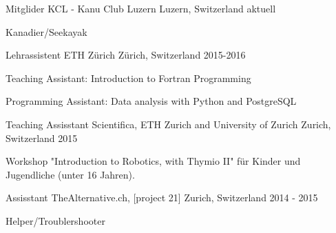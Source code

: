 

\begin{cventries}

\cventry
{Mitglider} %
{KCL - Kanu Club Luzern} %
{Luzern, Switzerland} %
{aktuell} %
{
	\begin{cvitems} %
		\item {Kanadier/Seekayak}
	\end{cvitems}
}
	
\cventry
	{Lehrassistent} %
	{ETH Zürich} %
	{Zürich, Switzerland} %
	{2015-2016} %
	{
		\begin{cvitems} %
			\item {Teaching Assistant: Introduction to Fortran Programming}
			\item {Programming Assistant: Data analysis with Python and PostgreSQL}
		\end{cvitems}
	}

\cventry
    {Teaching Assisstant} %
    {Scientifica, ETH Zurich and University of Zurich} %
    {Zurich, Switzerland} %
    {2015} %
    {
      \begin{cvitems} %
        \item {Workshop "Introduction to Robotics, with Thymio II" für Kinder und Jugendliche (unter 16 Jahren).}
      \end{cvitems}
    }

\cventry
    {Assisstant} %
    {TheAlternative.ch, [project 21]} %
    {Zurich, Switzerland} %
    {2014 - 2015} %
    {
      \begin{cvitems} %
        \item {Helper/Troublershooter}
      \end{cvitems}
    }


\end{cventries}
